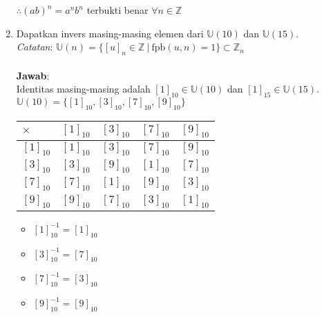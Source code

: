 \documentclass{article}
\begin{document}
\begin{enumerate}
    \vspace{0.1mm}
    $\therefore (ab)^n = a^nb^n$ terbukti benar $\forall n \in\mathbb{Z}$
    
    \item Dapatkan invers masing-masing elemen dari $\mathbb{U}(10)$ dan $\mathbb{U}(15)$.\\
    \textit{Catatan}: $\mathbb{U}(n)=\{[u]_n\in\mathbb{Z}\:|\:\textrm{fpb}(u,n)=1\}\subset\mathbb{Z}_n$\\~\\
    \textbf{Jawab}:\\
    Identitas masing-masing adalah $[1]_{10}\in\mathbb{U}(10)$ dan $[1]_{15}\in\mathbb{U}(15)$.\\
    
    \vspace{0.1mm}
    $\mathbb{U}(10)=\{[1]_{10},[3]_{10},[7]_{10},[9]_{10}\}$
    \begin{center}
    \begin{tabular}{|l|| c c c c|} 
        \hline
        \rowcolor{cyan}
         \color{purple}$\times$ & $[1]_{10}$ & $[3]_{10}$ & $[7]_{10}$ & $[9]_{10}$ \\
         \hline\hline
         $[1]_{10}$ & $[1]_{10}$ & $[3]_{10}$ & $[7]_{10}$ & $[9]_{10}$ \\
         $[3]_{10}$ & $[3]_{10}$ & $[9]_{10}$ & $[1]_{10}$ & $[7]_{10}$ \\
         $[7]_{10}$ & $[7]_{10}$ & $[1]_{10}$ & $[9]_{10}$ & $[3]_{10}$ \\
         $[9]_{10}$ & $[9]_{10}$ & $[7]_{10}$ & $[3]_{10}$ & $[1]_{10}$ \\
    \end{tabular}
    \end{center}
    \begin{itemize}
        \item $[1]_{10}^{-1}=[1]_{10}$
        \item $[3]_{10}^{-1}=[7]_{10}$
        \item $[7]_{10}^{-1}=[3]_{10}$
        \item $[9]_{10}^{-1}=[9]_{10}$
    \end{itemize}
    

\end{enumerate}
\end{document}
